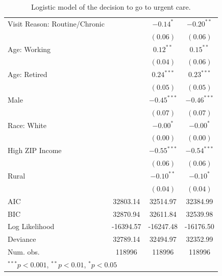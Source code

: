 \documentclass[12pt,twoside]{reedthesis}
\begin{document}
\begin{table}
\begin{center}
\begin{small}
\begin{tabular}{l c c c }
  Visit Reason: Routine/Chronic &               & $-0.14^{*}$   & $-0.20^{**}$  \\
                                &               & $(0.06)$      & $(0.06)$      \\
  Age: Working                  &               & $0.12^{**}$   & $0.15^{**}$   \\
                                &               & $(0.04)$      & $(0.06)$      \\
  Age: Retired                  &               & $0.24^{***}$  & $0.23^{***}$  \\
                                &               & $(0.05)$      & $(0.05)$      \\
  Male                          &               & $-0.45^{***}$ & $-0.46^{***}$ \\
                                &               & $(0.07)$      & $(0.07)$      \\
  Race: White                   &               & $-0.00^{*}$   & $-0.00^{*}$   \\
                                &               & $(0.00)$      & $(0.00)$      \\
  High ZIP Income               &               & $-0.55^{***}$ & $-0.54^{***}$ \\
                                &               & $(0.06)$      & $(0.06)$      \\
  Rural                         &               & $-0.10^{**}$  & $-0.10^{*}$   \\
                                &               & $(0.04)$      & $(0.04)$      \\
  \hline
  AIC                           & 32803.14      & 32514.97      & 32384.99      \\
  BIC                           & 32870.94      & 32611.84      & 32539.98      \\
  Log Likelihood                & -16394.57     & -16247.48     & -16176.50     \\
  Deviance                      & 32789.14      & 32494.97      & 32352.99      \\
  Num. obs.                     & 118996        & 118996        & 118996        \\
  \hline
  \multicolumn{4}{l}{\tiny{$^{***}p<0.001$, $^{**}p<0.01$, $^*p<0.05$}}
  \end{tabular}
  \end{small}
  \caption{Logistic model of the decision to go to urgent care.}
  \label{table:coefficients}
  \end{center}
  \end{table}
  
\end{document}
